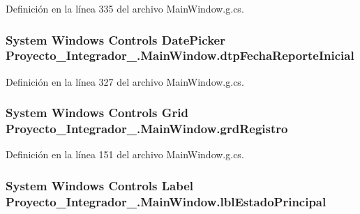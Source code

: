 Definición en la línea 335 del archivo Main\-Window.\-g.\-cs.

\hypertarget{class_proyecto___integrador__3_1_1_main_window_a44bbca638bf885c2bcc23fcfd2d605ac}{
\subsubsection[{dtp\-Fecha\-Reporte\-Inicial}]{\setlength{\rightskip}{0pt plus 5cm}System Windows Controls Date\-Picker Proyecto\-\_\-\-Integrador\-\_.\-Main\-Window.\-dtp\-Fecha\-Reporte\-Inicial\hspace{0.3cm}{\ttfamily [package]}}}\label{class_proyecto___integrador__3_1_1_main_window_a44bbca638bf885c2bcc23fcfd2d605ac}


Definición en la línea 327 del archivo Main\-Window.\-g.\-cs.

\hypertarget{class_proyecto___integrador__3_1_1_main_window_a9386928aff943060071efe864b17ca03}{
\subsubsection[{grd\-Registro}]{\setlength{\rightskip}{0pt plus 5cm}System Windows Controls Grid Proyecto\-\_\-\-Integrador\-\_.\-Main\-Window.\-grd\-Registro\hspace{0.3cm}{\ttfamily [package]}}}\label{class_proyecto___integrador__3_1_1_main_window_a9386928aff943060071efe864b17ca03}


Definición en la línea 151 del archivo Main\-Window.\-g.\-cs.

\hypertarget{class_proyecto___integrador__3_1_1_main_window_a3120ba863f838314aeed5764404c80d5}{
\subsubsection[{lbl\-Estado\-Principal}]{\setlength{\rightskip}{0pt plus 5cm}System Windows Controls Label Proyecto\-\_\-\-Integrador\-\_.\-Main\-Window.\-lbl\-Estado\-Principal\hspace{0.3cm}{\ttfamily [package]}}}\label{class_proyecto___integrador__3_1_1_main_window_a3120ba863f838314aeed5764404c80d5}


